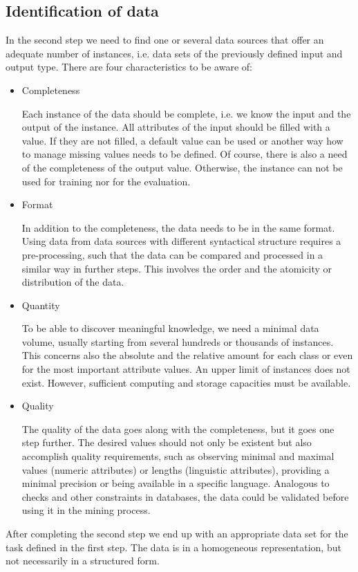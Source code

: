 \documentclass[article,type=msc,colorback,accentcolor=tud7b]{tudthesis}
\begin{document}
  \subsection{Identification of data}
    In the second step we need to find one or several data sources that offer an adequate number of instances, i.e. data sets of the previously defined input and output type. There are four characteristics to be aware of:
    \begin{itemize}
      \item Completeness
      
        Each instance of the data should be complete, i.e. we know the input and the output of the instance. All attributes of the input should be filled with a value. If they are not filled, a default value can be used or another way how to manage missing values needs to be defined. Of course, there is also a need of the completeness of the output value. Otherwise, the instance can not be used for training nor for the evaluation.
      \item Format
      
        In addition to the completeness, the data needs to be in the same format. Using data from data sources with different syntactical structure requires a pre-processing, such that the data can be compared and processed in a similar way in further steps. This involves the order and the atomicity or distribution of the data.
      \item Quantity
      
        To be able to discover meaningful knowledge, we need a minimal data volume, usually starting from several hundreds or thousands of instances. This concerns also the absolute and the relative amount for each class or even for the most important attribute values. An upper limit of instances does not exist. However, sufficient computing and storage capacities must be available.
      \item Quality
      
        The quality of the data goes along with the completeness, but it goes one step further. The desired values should not only be existent but also accomplish quality requirements, such as observing minimal and maximal values (numeric attributes) or lengths (linguistic attributes), providing a minimal precision or being available in a specific language. Analogous to checks and other constraints in databases, the data could be validated before using it in the mining process.
    \end{itemize}
    After completing the second step we end up with an appropriate data set for the task defined in the first step. The data is in a homogeneous representation, but not necessarily in a structured form.
\end{document}
